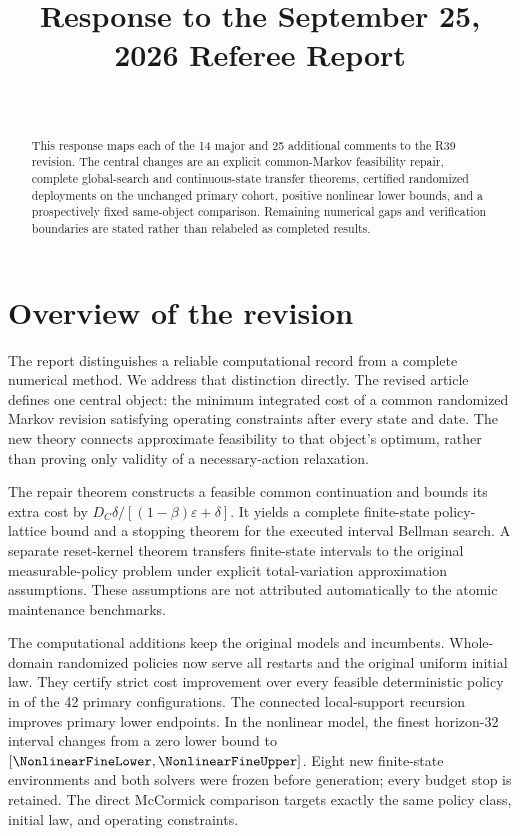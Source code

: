 


\begin{frontmatter}
\title{Response to the September 25, 2026 Referee Report}
\begin{aug}\author[id=au1,addressref={add1}]{~}\address[id=add1]{}\end{aug}
\begin{abstract}This response maps each of the 14 major and 25 additional comments to the R39 revision. The central changes are an explicit common-Markov feasibility repair, complete global-search and continuous-state transfer theorems, certified randomized deployments on the unchanged primary cohort, positive nonlinear lower bounds, and a prospectively fixed same-object comparison. Remaining numerical gaps and verification boundaries are stated rather than relabeled as completed results.\end{abstract}
\end{frontmatter}

\section{Overview of the revision}
The report distinguishes a reliable computational record from a complete numerical method. We address that distinction directly. The revised article defines one central object: the minimum integrated cost of a common randomized Markov revision satisfying operating constraints after every state and date. The new theory connects approximate feasibility to that object's optimum, rather than proving only validity of a necessary-action relaxation.

The repair theorem constructs a feasible common continuation and bounds its extra cost by $D_C\delta/[(1-\beta)\varepsilon+\delta]$. It yields a complete finite-state policy-lattice bound and a stopping theorem for the executed interval Bellman search. A separate reset-kernel theorem transfers finite-state intervals to the original measurable-policy problem under explicit total-variation approximation assumptions. These assumptions are not attributed automatically to the atomic maintenance benchmarks.

The computational additions keep the original models and incumbents. Whole-domain randomized policies now serve all restarts and the original uniform initial law. They certify strict cost improvement over every feasible deterministic policy in \PrimaryStrict{} of the 42 primary configurations. The connected local-support recursion improves \LocalImproveCount{} primary lower endpoints. In the nonlinear model, the finest horizon-32 interval changes from a zero lower bound to $[\NonlinearFineLower,\NonlinearFineUpper]$. Eight new finite-state environments and both solvers were frozen before generation; every budget stop is retained. The direct McCormick comparison targets exactly the same policy class, initial law, and operating constraints.

